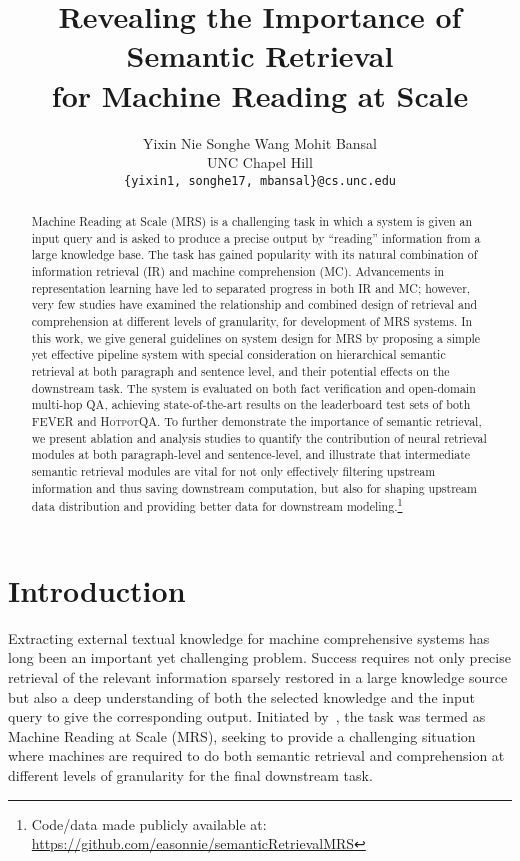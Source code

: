 \documentclass[11pt,a4paper]{article}
\title{Revealing the Importance of Semantic Retrieval \\ for Machine Reading at Scale}
\author{Yixin Nie \;\;\;\;\;\; Songhe Wang \;\;\;\;\;\; Mohit Bansal\\
  UNC Chapel Hill \\
  {\tt \{yixin1, songhe17, mbansal\}@cs.unc.edu} \\
}
\date{}
\newcommand\fever{FEVER\xspace}
\newcommand\hpqa{\textsc{HotpotQA}\xspace}
\begin{document}
\maketitle
\begin{abstract}
  Machine Reading at Scale (MRS) is a challenging task in which a system is given an input query and is asked to produce a precise output by ``reading'' information from a large knowledge base. The task has gained popularity with its natural combination of information retrieval (IR) and machine comprehension (MC).
  Advancements in representation learning have led to separated progress in both IR and MC; however, very few studies have examined the relationship and combined design of retrieval and comprehension at different levels of granularity, for development of MRS systems.
  In this work, we give general guidelines on system design for MRS by proposing a simple yet effective pipeline system with special consideration on hierarchical semantic retrieval at both paragraph and sentence level, and their potential effects on the downstream task.
  The system is evaluated on both fact verification and open-domain multi-hop QA, achieving state-of-the-art results on the leaderboard test sets of both \fever and \hpqa.
  To further demonstrate the importance of semantic retrieval, we present ablation and analysis studies to quantify the contribution of neural retrieval modules at both paragraph-level and sentence-level, and illustrate that intermediate semantic retrieval modules are vital for not only effectively filtering upstream information and thus saving downstream computation, but also for shaping upstream data distribution and providing better data for downstream modeling.\footnote{Code/data made publicly available at: \url{https://github.com/easonnie/semanticRetrievalMRS}}
\end{abstract}

\section{Introduction}

Extracting external textual knowledge for machine comprehensive systems has long been an important yet challenging problem. Success requires not only precise retrieval of the relevant information sparsely restored in a large knowledge source but also a deep understanding of both the selected knowledge and the input query to give the corresponding output. Initiated by~, the task was termed as Machine Reading at Scale (MRS), seeking to provide a challenging situation where machines are required to do both semantic retrieval and comprehension at different levels of granularity for the final downstream task. 
\end{document}
